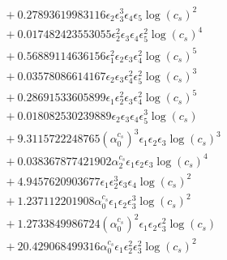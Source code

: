 \documentclass[10pt]{article}
\begin{document}
\begin{align*}
&{}  + 0.27893619983116 \epsilon_{2} \epsilon_{3}^{3} \epsilon_{4} \epsilon_{5} \log{\left(c_{s} \right)}^{2} \\
&{}  + 0.017482423553055 \epsilon_{2}^{2} \epsilon_{3} \epsilon_{4} \epsilon_{5}^{2} \log{\left(c_{s} \right)}^{4} \\
&{}  + 0.56889114636156 \epsilon_{1}^{2} \epsilon_{2} \epsilon_{3} \epsilon_{4}^{2} \log{\left(c_{s} \right)}^{5} \\
&{}  + 0.03578086614167 \epsilon_{2} \epsilon_{3} \epsilon_{4}^{2} \epsilon_{5}^{2} \log{\left(c_{s} \right)}^{3} \\
&{}  + 0.28691533605899 \epsilon_{1} \epsilon_{2}^{2} \epsilon_{3} \epsilon_{4}^{2} \log{\left(c_{s} \right)}^{5} \\
&{}  + 0.018082530239889 \epsilon_{2} \epsilon_{3} \epsilon_{4} \epsilon_{5}^{3} \log{\left(c_{s} \right)} \\
&{}  + 9.3115722248765 \left(\alpha_{0}^{c_s}\right)^{3} \epsilon_{1} \epsilon_{2} \epsilon_{3} \log{\left(c_{s} \right)}^{3} \\
&{}  + 0.038367877421902 \alpha_{2}^{c_s} \epsilon_{1} \epsilon_{2} \epsilon_{3} \log{\left(c_{s} \right)}^{4} \\
&{}  + 4.9457620903677 \epsilon_{1} \epsilon_{2}^{3} \epsilon_{3} \epsilon_{4} \log{\left(c_{s} \right)}^{2} \\
&{}  + 1.237112201908 \alpha_{0}^{c_s} \epsilon_{1} \epsilon_{2} \epsilon_{3}^{3} \log{\left(c_{s} \right)}^{2} \\
&{}  + 1.2733849986724 \left(\alpha_{0}^{c_s}\right)^{2} \epsilon_{1} \epsilon_{2} \epsilon_{3}^{2} \log{\left(c_{s} \right)} \\
&{}  + 20.429068499316 \alpha_{0}^{c_s} \epsilon_{1} \epsilon_{2}^{2} \epsilon_{3}^{2} \log{\left(c_{s} \right)}^{2}
\end{align*}
\end{document}
